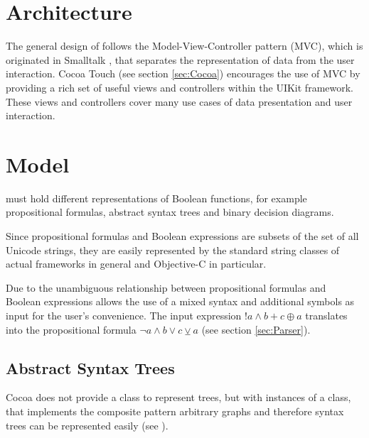 
\section{Architecture}

The general design of \Nyaya follows the Model-View-Controller pattern (MVC),
which is originated in Smalltalk \cite[p.4]{GAMMAETAL}, 
that separates the representation of data from the user interaction.
Cocoa Touch (see section \vref{sec:Cocoa}) encourages the use of MVC
by providing a rich set of useful views and controllers within the UIKit framework.
These views and controllers cover many use cases of data presentation and user interaction.

\section{Model}

\Nyaya must hold different representations of Boolean functions, 
for example propositional formulas, abstract syntax trees and binary decision diagrams. 

Since propositional formulas and Boolean expressions are subsets of the set of all Unicode strings,
they are easily represented by the standard string classes of actual frameworks in general and Objective-C in particular. 

Due to the unambiguous relationship between propositional formulas and Boolean expressions 
\Nyaya allows the use of a mixed syntax and additional symbols as input
for the user's convenience. The input expression $!a \wedge b + c \oplus a$ 
translates into the propositional formula
$\neg a \wedge b \vee c \veebar a$ (see section \vref{sec:Parser}).

\subsection{Abstract Syntax Trees}
\label{sec:AST}

Cocoa does not provide a class to represent trees, 
but with instances of a class, 
that implements the composite pattern \cite[p.163ff]{GAMMAETAL}
arbitrary graphs and therefore syntax trees can be represented easily (see ).

